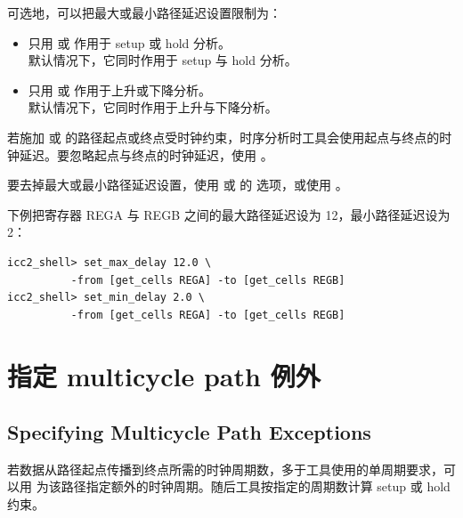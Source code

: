 可选地，可以把最大或最小路径延迟设置限制为：
\begin{itemize}
  \item 只用  或  作用于 setup 或 hold 分析。\\
        默认情况下，它同时作用于 setup 与 hold 分析。
  \item 只用  或  作用于上升或下降分析。\\
        默认情况下，它同时作用于上升与下降分析。
\end{itemize}

若施加  或  的路径起点或终点受时钟约束，时序分析时工具会使用起点与终点的时钟延迟。要忽略起点与终点的时钟延迟，使用 。

要去掉最大或最小路径延迟设置，使用  或  的  选项，或使用 。

下例把寄存器 REGA 与 REGB 之间的最大路径延迟设为 12，最小路径延迟设为 2：
\begin{lstlisting}
icc2_shell> set_max_delay 12.0 \
          -from [get_cells REGA] -to [get_cells REGB]
icc2_shell> set_min_delay 2.0 \
          -from [get_cells REGA] -to [get_cells REGB]
\end{lstlisting}

\section{指定 multicycle path 例外}
\subsection*{Specifying Multicycle Path Exceptions}

若数据从路径起点传播到终点所需的时钟周期数，多于工具使用的单周期要求，可以用  为该路径指定额外的时钟周期。随后工具按指定的周期数计算 setup 或 hold 约束。

